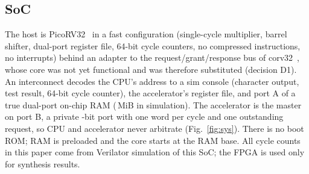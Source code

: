 \documentclass[journal]{IEEEtran}
\begin{document}
\subsection{SoC}
The host is PicoRV32~\cite{picorv32} in a fast configuration (single-cycle multiplier, barrel shifter, dual-port register file, 64-bit cycle counters, no compressed instructions, no interrupts) behind an adapter to the request/grant/response bus of corv32~\cite{corv32_repo}, whose core was not yet functional and was therefore substituted (decision D1). An interconnect decodes the CPU's address to a sim console (character output, test result, 64-bit cycle counter), the accelerator's register file, and port A of a true dual-port on-chip RAM (\RamMiB{}\,MiB in simulation). The accelerator is the master on port B, a private \PortBits-bit port with one word per cycle and one outstanding request, so CPU and accelerator never arbitrate (Fig.~\ref{fig:sys}). There is no boot ROM; RAM is preloaded and the core starts at the RAM base. All cycle counts in this paper come from Verilator simulation of this SoC; the FPGA is used only for synthesis results.
\end{document}
